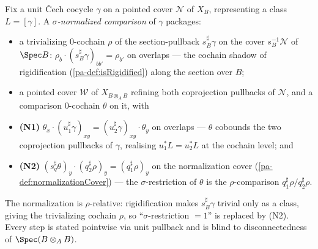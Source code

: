 \begin{definition}
  \label{pa-def:normalizedCechComparison}
  \leanok

  Fix a unit \v Cech cocycle \(\gamma\) on a pointed cover \(\mathcal N\) of \(X_B\), representing
  a class \(L = [\gamma]\). A \emph{\(\sigma\)-normalized comparison} of \(\gamma\) packages:
  \begin{itemize}
    \item a trivializing \(0\)-cochain \(\rho\) of the section-pullback \(s_B^{\sharp}\gamma\) on
      the cover \(s_B^{-1}\mathcal N\) of \(\Spec B\): \(\rho_b \cdot (s_B^{\sharp}\gamma)_{b b'} =
      \rho_{b'}\) on overlaps — the cochain shadow of rigidification (\ref{pa-def:isRigidified})
      along the section over \(B\);
    \item a pointed cover \(\mathcal W\) of \(X_{B \otimes_A B}\) refining both coprojection
      pullbacks of \(\mathcal N\), and a comparison \(0\)-cochain \(\theta\) on it, with
    \item \textbf{(N1)} \(\theta_x \cdot (u_1^{\sharp}\gamma)_{x y} = (u_2^{\sharp}\gamma)_{x y}
      \cdot \theta_y\) on overlaps — \(\theta\) cobounds the two coprojection pullbacks of
      \(\gamma\), realising \(u_1^{*} L = u_2^{*} L\) at the cochain level; and
    \item \textbf{(N2)} \((s_q^{\sharp}\theta)_y \cdot (q_2^{\sharp}\rho)_y = (q_1^{\sharp}\rho)_y\)
      on the normalization cover (\ref{pa-def:normalizationCover}) — the \(\sigma\)-restriction of
      \(\theta\) is the \(\rho\)-comparison \(q_1^{\sharp}\rho / q_2^{\sharp}\rho\).
  \end{itemize}
  The normalization is \(\rho\)-relative: rigidification makes \(s_B^{\sharp}\gamma\) trivial only
  as a class, giving the trivializing cochain \(\rho\), so ``\(\sigma\)-restriction \(=1\)'' is
  replaced by (N2). Every step is stated pointwise via unit pullback and is blind to
  disconnectedness of \(\Spec(B \otimes_A B)\).
\end{definition}

